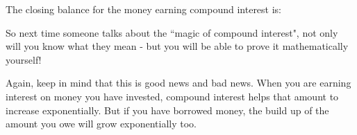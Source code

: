         
        \label{m39334*id73640}The closing balance for the money earning compound interest is:\par 
        \label{m39334*id73644}\nopagebreak\noindent{}
    
        
        \label{m39334*id73760}So next time someone talks about the ``magic of compound interest", not only will you know what they mean - but you will be able to prove it mathematically yourself!\par 
        \label{m39334*id73766}Again, keep in mind that this is good news and bad news. When you are earning interest on money you have invested, compound interest helps that amount to increase exponentially. But if you have borrowed money, the build up of the amount you owe will grow exponentially too.\par 
\label{m39334*secfhsst!!!underscore!!!id2645}\vspace{.5cm} 
      
